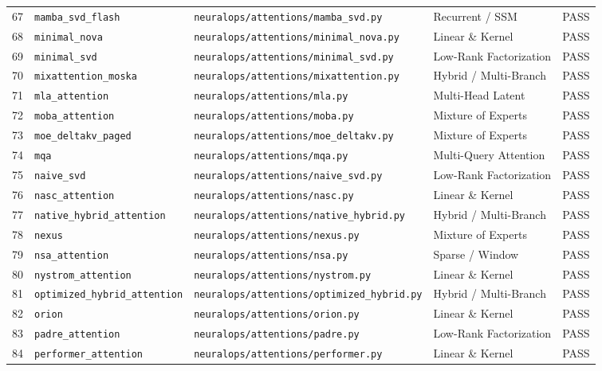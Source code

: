 \begin{center}
\begin{longtable}{rllll}
67 & \texttt{mamba\_svd\_flash} & \texttt{neuralops/attentions/mamba\_svd.py} & Recurrent / SSM & PASS \\
68 & \texttt{minimal\_nova} & \texttt{neuralops/attentions/minimal\_nova.py} & Linear \& Kernel & PASS \\
69 & \texttt{minimal\_svd} & \texttt{neuralops/attentions/minimal\_svd.py} & Low-Rank Factorization & PASS \\
70 & \texttt{mixattention\_moska} & \texttt{neuralops/attentions/mixattention.py} & Hybrid / Multi-Branch & PASS \\
71 & \texttt{mla\_attention} & \texttt{neuralops/attentions/mla.py} & Multi-Head Latent & PASS \\
72 & \texttt{moba\_attention} & \texttt{neuralops/attentions/moba.py} & Mixture of Experts & PASS \\
73 & \texttt{moe\_deltakv\_paged} & \texttt{neuralops/attentions/moe\_deltakv.py} & Mixture of Experts & PASS \\
74 & \texttt{mqa} & \texttt{neuralops/attentions/mqa.py} & Multi-Query Attention & PASS \\
75 & \texttt{naive\_svd} & \texttt{neuralops/attentions/naive\_svd.py} & Low-Rank Factorization & PASS \\
76 & \texttt{nasc\_attention} & \texttt{neuralops/attentions/nasc.py} & Linear \& Kernel & PASS \\
77 & \texttt{native\_hybrid\_attention} & \texttt{neuralops/attentions/native\_hybrid.py} & Hybrid / Multi-Branch & PASS \\
78 & \texttt{nexus} & \texttt{neuralops/attentions/nexus.py} & Mixture of Experts & PASS \\
79 & \texttt{nsa\_attention} & \texttt{neuralops/attentions/nsa.py} & Sparse / Window & PASS \\
80 & \texttt{nystrom\_attention} & \texttt{neuralops/attentions/nystrom.py} & Linear \& Kernel & PASS \\
81 & \texttt{optimized\_hybrid\_attention} & \texttt{neuralops/attentions/optimized\_hybrid.py} & Hybrid / Multi-Branch & PASS \\
82 & \texttt{orion} & \texttt{neuralops/attentions/orion.py} & Linear \& Kernel & PASS \\
83 & \texttt{padre\_attention} & \texttt{neuralops/attentions/padre.py} & Low-Rank Factorization & PASS \\
84 & \texttt{performer\_attention} & \texttt{neuralops/attentions/performer.py} & Linear \& Kernel & PASS \\

\end{longtable}
\end{center}
